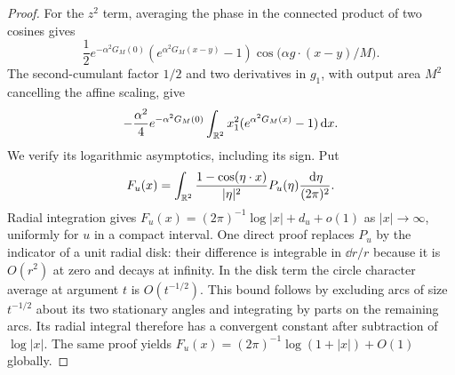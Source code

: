 \begin{proof}
For the $z^2$ term, averaging the phase in the connected product of
two cosines gives
\[
 \frac12e^{-\alpha^2G_M(0)}
          (e^{\alpha^2G_M(x-y)}-1)
          \cos\big(\alpha g\cdot(x-y)/M\big).
\]
The second-cumulant factor $1/2$ and two derivatives in $g_1$,
with output area $M^2$ cancelling the affine scaling, give
\begin{equation}\label{wh:neutral-diagnostic}
 -\frac{\alpha^2}{4}e^{-\alpha^2G_M(0)}
       \int_{\mathbb R^2}x_1^2(e^{\alpha^2G_M(x)}-1)\,\mathrm d x.
\end{equation}
We verify its logarithmic asymptotics, including its sign.  Put
\[
 F_u(x)=\int_{\mathbb R^2}
       \frac{1-\cos(\eta\cdot x)}{|\eta|^2}
                          P_u(\eta)\frac{\,\mathrm d\eta}{(2\pi)^2}.
\]
Radial integration gives
$F_u(x)=(2\pi)^{-1}\log|x|+d_u+o(1)$ as $|x|\to\infty$,
uniformly for $u$ in a compact interval.  One direct proof replaces
$P_u$ by the indicator of a unit radial disk: their difference is
integrable in $\dd r/r$ because it is $O(r^2)$ at zero and decays
at infinity.  In the disk term the circle character average at
argument $t$ is $O(t^{-1/2})$.  This bound follows by excluding
arcs of size $t^{-1/2}$ about its two stationary angles and
integrating by parts on the remaining arcs.  Its radial integral
therefore has a convergent constant after subtraction of $\log|x|$.
The same proof yields
$F_u(x)=(2\pi)^{-1}\log(1+|x|)+O(1)$ globally.


\end{proof}
